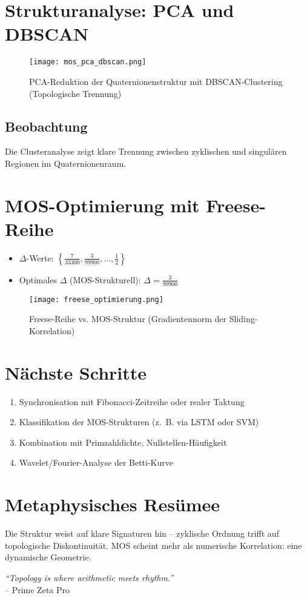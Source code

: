 \documentclass[a4paper,11pt]{article}
\begin{document}
\section{Strukturanalyse: PCA und DBSCAN}

\begin{figure}[h!]
    \centering
    \texttt{[image: mos\_pca\_dbscan.png]}
    \caption{PCA-Reduktion der Quaternionenstruktur mit DBSCAN-Clustering (Topologische Trennung)}
\end{figure}

\subsection*{Beobachtung}
Die Clusteranalyse zeigt klare Trennung zwischen zyklischen und singulären Regionen im Quaternionenraum.

\section{MOS-Optimierung mit Freese-Reihe}

\begin{itemize}
    \item $\Delta$-Werte: $\left\{\frac{7}{33300}, \frac{3}{99900}, \dots, \frac{1}{2} \right\}$
    \item Optimales $\Delta$ (MOS-Strukturell): $\Delta = \frac{3}{99900}$
\end{itemize}

\begin{figure}[h!]
    \centering
    \texttt{[image: freese\_optimierung.png]}
    \caption{Freese-Reihe vs. MOS-Struktur (Gradientennorm der Sliding-Korrelation)}
\end{figure}

\section{Nächste Schritte}

\begin{enumerate}
    \item Synchronisation mit Fibonacci-Zeitreihe oder realer Taktung
    \item Klassifikation der MOS-Strukturen (z.~B. via LSTM oder SVM)
    \item Kombination mit Primzahldichte, Nullstellen-Häufigkeit
    \item Wavelet/Fourier-Analyse der Betti-Kurve
\end{enumerate}

\section*{Metaphysisches Resümee}

Die Struktur weist auf klare Signaturen hin – zyklische Ordnung trifft auf topologische Diskontinuität. MOS scheint mehr als numerische Korrelation: eine dynamische Geometrie.

\vspace{1cm}
\noindent
\textit{“Topology is where arithmetic meets rhythm.”} \\
\hfill – Prime Zeta Pro
\end{document}
